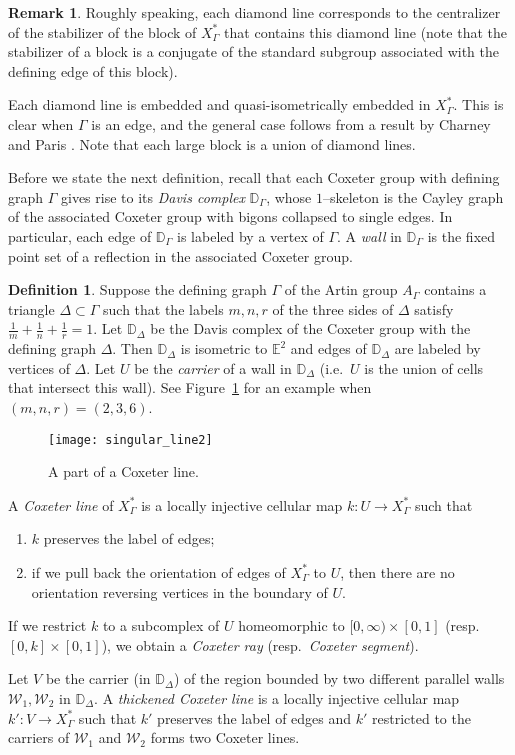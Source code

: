 \documentclass[11pt]{amsart}
\newcommand {\D}{\mathbb D}
\newcommand {\W}{\mathcal W}
\theoremstyle{definition}
\newtheorem{definition}[theorem]{Definition}
\newtheorem{remark}[theorem]{Remark}
\newcommand{\Xa}{X^{\ast}}
\begin{document}
\begin{remark}
Roughly speaking, each diamond line corresponds to the centralizer of the stabilizer of the block of $\Xa_\Gamma$ that contains this diamond line (note that the stabilizer of a block is a conjugate of the standard subgroup associated with the defining edge of this block).
\end{remark}

Each diamond line is embedded and quasi-isometrically embedded in $\Xa_\Gamma$. This is clear when $\Gamma$ is an edge, and the general case follows from a result by Charney and Paris \cite[Theorem 1.2]{charney2014convexity}.
Note that each large block is a union of diamond lines.

Before we state the next definition, recall that each Coxeter group with defining graph $\Gamma$ gives rise to its \emph{Davis complex} $\D_\Gamma$, whose $1$--skeleton is the Cayley graph of the associated Coxeter group with bigons collapsed to single edges. In particular, each edge of $\D_\Gamma$ is labeled by a vertex of $\Gamma$. A \emph{wall} in $\D_\Gamma$ is the fixed point set of a reflection in the associated Coxeter group. 

\begin{definition}
	\label{def:wall line}
Suppose the defining graph $\Gamma$ of the Artin group $A_\Gamma$ contains a triangle $\Delta\subset\Gamma$ such that the labels $m,n,r$ of the three sides of $\Delta$ satisfy $\frac{1}{m}+\frac{1}{n}+\frac{1}{r}=1$. Let $\D_\Delta$ be the Davis complex of the Coxeter group with the defining graph $\Delta$. Then $\D_\Delta$ is isometric to $\mathbb E^2$ and edges of $\D_\Delta$ are labeled by vertices of $\Delta$. Let $U$ be the \emph{carrier} of a wall in $\D_\Delta$ (i.e.\ $U$ is the union of cells that intersect this wall). See Figure~\ref{f:singular_line2} for an example when $(m,n,r)=(2,3,6)$.
\begin{figure}[h!]
	\centering
	\texttt{[image: singular\_line2]}
	\caption{A part of a Coxeter line.}
	\label{f:singular_line2}
\end{figure}
A \emph{Coxeter line} of $\Xa_\Gamma$ is a locally injective cellular map $k\colon U\to \Xa_\Gamma$ such that
	\begin{enumerate}
		\item $k$ preserves the label of edges;
		\item if we pull back the orientation of edges of $\Xa_\Gamma$ to $U$, then there are no orientation reversing vertices in the boundary of $U$.
	\end{enumerate}
If we restrict $k$ to a subcomplex of $U$ homeomorphic to $[0,\infty)\times[0,1]$ (resp.\ $[0,k]\times[0,1]$), we obtain a \emph{Coxeter ray} (resp.\ \emph{Coxeter segment}).

Let $V$ be the carrier (in $\D_\Delta$) of the region bounded by two different parallel walls $\W_1,\W_2$ in $\D_{\Delta}$. A \emph{thickened Coxeter line} is a locally injective cellular map $k'\colon V\to \Xa_\Gamma$ such that $k'$ preserves the label of edges and $k'$ restricted to the carriers of $\W_1$ and $\W_2$ forms two Coxeter lines.
\end{definition}
\end{document}
